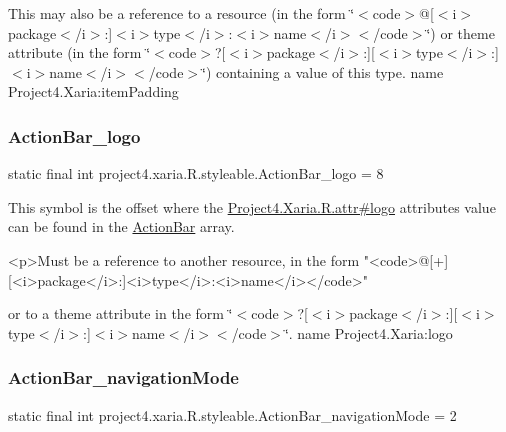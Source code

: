 This may also be a reference to a resource (in the form \char`\"{}$<$code$>$@\mbox{[}$<$i$>$package$<$/i$>$\+:\mbox{]}$<$i$>$type$<$/i$>$\+:$<$i$>$name$<$/i$>$$<$/code$>$\char`\"{}) or theme attribute (in the form \char`\"{}$<$code$>$?\mbox{[}$<$i$>$package$<$/i$>$\+:\mbox{]}\mbox{[}$<$i$>$type$<$/i$>$\+:\mbox{]}$<$i$>$name$<$/i$>$$<$/code$>$\char`\"{}) containing a value of this type.  name Project4.\+Xaria\+:item\+Padding \mbox{\label{classproject4_1_1xaria_1_1R_1_1styleable_a29368a7dcfad1ef0f8e7537d44b3cf41}} 
\subsubsection{\texorpdfstring{Action\+Bar\+\_\+logo}{ActionBar\_logo}}
{\footnotesize\ttfamily static final int project4.\+xaria.\+R.\+styleable.\+Action\+Bar\+\_\+logo = 8\hspace{0.3cm}{\ttfamily [static]}}

This symbol is the offset where the \hyperlink{}{Project4.\+Xaria.\+R.\+attr\#logo} attribute\textquotesingle{}s value can be found in the \hyperlink{classproject4_1_1xaria_1_1R_1_1styleable_accb530194c58ee3abb15587da8869e99}{Action\+Bar} array.

\begin{DoxyVerb}      <p>Must be a reference to another resource, in the form "<code>@[+][<i>package</i>:]<i>type</i>:<i>name</i></code>"
\end{DoxyVerb}
 or to a theme attribute in the form \char`\"{}$<$code$>$?\mbox{[}$<$i$>$package$<$/i$>$\+:\mbox{]}\mbox{[}$<$i$>$type$<$/i$>$\+:\mbox{]}$<$i$>$name$<$/i$>$$<$/code$>$\char`\"{}.  name Project4.\+Xaria\+:logo \mbox{\label{classproject4_1_1xaria_1_1R_1_1styleable_a8a75ec93401c4f373036ed6d0abe042e}} 
\subsubsection{\texorpdfstring{Action\+Bar\+\_\+navigation\+Mode}{ActionBar\_navigationMode}}
{\footnotesize\ttfamily static final int project4.\+xaria.\+R.\+styleable.\+Action\+Bar\+\_\+navigation\+Mode = 2\hspace{0.3cm}{\ttfamily [static]}}

